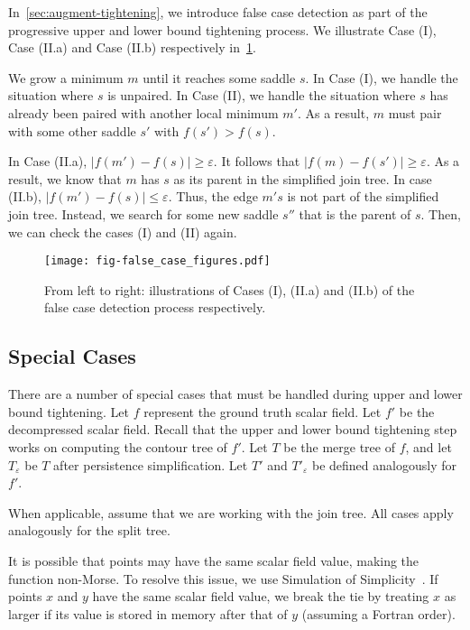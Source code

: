 In~\cref{sec:augment-tightening}, we introduce false case detection as part of the progressive upper and lower bound tightening process. 
We illustrate Case (I), Case (II.a) and Case (II.b) respectively in~\cref{fig:false-case-figures}. 

We grow a minimum $m$ until it reaches some saddle $s$. 
In Case (I), we handle the situation where $s$ is unpaired. 
In Case (II), we handle the situation where $s$ has already been paired with another local minimum $m'$. As a result, $m$ must pair with some other saddle $s'$ with $f(s') > f(s)$.

In Case (II.a), $|f(m') - f(s)| \geq \varepsilon$. It follows that $|f(m) - f(s')| \geq \varepsilon$. As a result, we know that $m$ has $s$ as its parent in the simplified join tree.
In case (II.b), $|f(m') - f(s)| \leq \varepsilon$. Thus, the edge $m's$ is not part of the simplified join tree. Instead, we search for some new saddle $s''$ that is the parent of $s$. Then, we can check the cases (I) and (II) again.

\begin{figure}[!ht]
\centering
\texttt{[image: fig-false\_case\_figures.pdf]}
\caption{From left to right: illustrations of Cases (I), (II.a) and (II.b) of the false case detection process respectively.}
\label{fig:false-case-figures}
\end{figure}



\subsection{Special Cases}
\label{sec:special-cases}

There are a number of special cases that must be handled during upper and lower bound tightening. Let $f$ represent the ground truth scalar field. Let $f'$ be the decompressed scalar field. Recall that the upper and lower bound tightening step works on computing the contour tree of $f'$. Let $T$ be the merge tree of $f$, and let $T_\varepsilon$ be $T$ after persistence simplification.
Let $T'$ and $T'_\varepsilon$ be defined analogously for $f'$.

When applicable, assume that we are working with the join tree. All cases apply analogously for the split tree.

It is possible that points may have the same scalar field value, making the function non-Morse. To resolve this issue, we use Simulation of Simplicity~\cite{edelsbrunner1990simulation}. If points $x$ and $y$ have the same scalar field value, we break the tie by treating $x$ as larger if its value is stored in memory after that of $y$ (assuming a Fortran order). %

